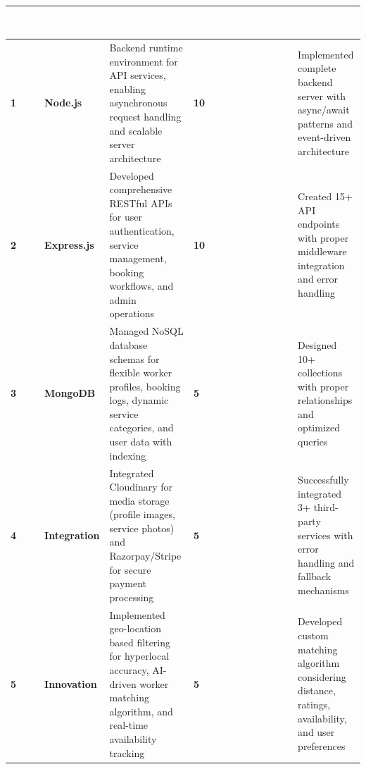 \documentclass[12pt,a4paper]{article}
\begin{document}
\begin{table}[h!]
\centering
\renewcommand{\arraystretch}{1.5}
\begin{tabular}{|>{\centering\arraybackslash}p{1cm}|p{2.2cm}|p{3.5cm}|>{\centering\arraybackslash}p{1.5cm}|>{\centering\arraybackslash}p{1.5cm}|p{4cm}|}
\hline
\rowcolor{headerblue}
\textcolor{white}{\textbf{S.No}} & 
\multicolumn{1}{c|}{\textcolor{white}{\textbf{Concept}}} & 
\multicolumn{1}{c|}{\textcolor{white}{\textbf{Contribution}}} & 
\textcolor{white}{\textbf{Marks Allotted}} & 
\textcolor{white}{\textbf{Marks Awarded}} & 
\multicolumn{1}{c|}{\textcolor{white}{\textbf{Additional Info}}} \\
\hline
\rowcolor{lightgray}
\textbf{1} & \textbf{Node.js} & Backend runtime environment for API services, enabling asynchronous request handling and scalable server architecture & \textbf{10} & & Implemented complete backend server with async/await patterns and event-driven architecture \\
\hline

\textbf{2} & \textbf{Express.js} & Developed comprehensive RESTful APIs for user authentication, service management, booking workflows, and admin operations & \textbf{10} & & Created 15+ API endpoints with proper middleware integration and error handling \\
\hline
\rowcolor{lightgray}
\textbf{3} & \textbf{MongoDB} & Managed NoSQL database schemas for flexible worker profiles, booking logs, dynamic service categories, and user data with indexing & \textbf{5} & & Designed 10+ collections with proper relationships and optimized queries \\
\hline

\textbf{4} & \textbf{Integration} & Integrated Cloudinary for media storage (profile images, service photos) and Razorpay/Stripe for secure payment processing & \textbf{5} & & Successfully integrated 3+ third-party services with error handling and fallback mechanisms \\
\hline
\rowcolor{lightgray}
\textbf{5} & \textbf{Innovation} & Implemented geo-location based filtering for hyperlocal accuracy, AI-driven worker matching algorithm, and real-time availability tracking & \textbf{5} & & Developed custom matching algorithm considering distance, ratings, availability, and user preferences \\
\hline


\end{tabular}
\end{table}
\end{document}
